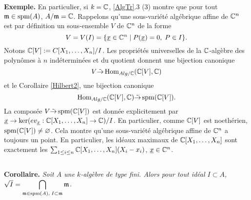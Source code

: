 \textbf{Exemple.} En particulier, si $k=\mathbb{C}$,  \ref{AlgTr}.3 (3) montre que pour tout $\frak{m}\in \operatorname{spm}(A)$, $A/\frak{m}=\mathbb{C}$. Rappelons qu'une sous-variété algébrique affine de $\mathbb{C}^n$ est par définition un sous-ensemble $V$ de $\mathbb{C}^n$ de la forme
$$V=V(I)=\lbrace \underline{x}\in \mathbb{C}^n\; |\; P(\underline{x})=0, \; P\in I\rbrace.$$ Notons $\mathbb{C}[V]:=C[X_1,\dots, X_n]/I$. Les propriétés universelles de la $\mathbb{C}$-algèbre des polynômes à $n$ indéterminées et du quotient donnent une bijection canonique
$$V\tilde{\rightarrow}\operatorname{Hom}_{Alg/\mathbb{C}}(\mathbb{C}[V],\mathbb{C})$$
et le Corollaire \ref{Hilbert2}, une bijection canonique  $$\operatorname{Hom}_{Alg/\mathbb{C}}(\mathbb{C}[V],\mathbb{C})\tilde{\rightarrow} \operatorname{spm}(\mathbb{C}[V]).$$
La composée $V\tilde{\rightarrow} \operatorname{spm}(\mathbb{C}[V])$ est donnée explicitement par $\underline{x}\rightarrow \ker(ev_{\underline{x}}:\mathbb{C}[X_1,\dots,X_n]\rightarrow \mathbb{C})/I$. En particulier, comme $\mathbb{C}[V]$ est noethérien,  $\operatorname{spm}(\mathbb{C}[V])\not=\varnothing$. Cela montre qu'une sous-variété algébrique affine de $\mathbb{C}^n$ a  toujours un point. En particulier, les idéaux maximaux de $\mathbb{C}[X_1,\dots, X_n]$ sont exactement les $\sum_{1\leq i\leq n}\mathbb{C}[X_1,\dots, X_n](X_i-x_i)$, $\underline{x}\in \mathbb{C}^n$.

 \subsection{}\label{Hilbert3}\textbf{Corollaire.} \textit{Soit $A$ une $k$-algèbre de type fini. Alors pour tout idéal $I\subset A$, $\sqrt{I}=\displaystyle{\bigcap_{\frak{m}\in \operatorname{spm}(A),\; I\subset \frak{m}}\frak{m}}$.}

